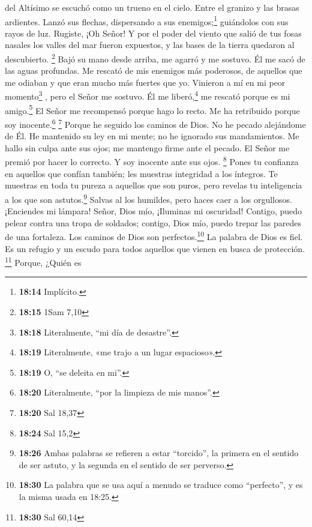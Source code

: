 del Altísimo se escuchó como un trueno en el cielo. Entre el granizo y
las brasas ardientes.  Lanzó sus flechas, dispersando a
sus enemigos;\footnote{\textbf{18:14} Implícito.} guiándolos con sus
rayos de luz.  Rugiste, ¡Oh Señor! Y por el poder del
viento que salió de tus fosas nasales los valles del mar fueron
expuestos, y las bases de la tierra quedaron al descubierto. \footnote{\textbf{18:15}
  1Sam 7,10}  Bajó su mano desde arriba, me agarró y me
sostuvo. Él me sacó de las aguas profundas.  Me rescató
de mis enemigos más poderosos, de aquellos que me odiaban y que eran
mucho más fuertes que yo.  Vinieron a mí en mi peor
momento\footnote{\textbf{18:18} Literalmente, ``mi día de desastre''.} ,
pero el Señor me sostuvo.  Él me liberó,\footnote{\textbf{18:19}
  Literalmente, «me trajo a un lugar espacioso».} me rescató porque es
mi amigo.\footnote{\textbf{18:19} O, ``se deleita en mi''.}
 El Señor me recompensó porque hago lo recto. Me ha
retribuido porque soy inocente.\footnote{\textbf{18:20} Literalmente,
  ``por la limpieza de mis manos''.} \footnote{\textbf{18:20} Sal 18,37}
 Porque he seguido los caminos de Dios. No he pecado
alejándome de Él.  He mantenido su ley en mi mente; no he
ignorado sus mandamientos.  Me hallo sin culpa ante sus
ojos; me mantengo firme ante el pecado.  El Señor me
premió por hacer lo correcto. Y soy inocente ante sus ojos. \footnote{\textbf{18:24}
  Sal 15,2}  Pones tu confianza en aquellos que confían
también; les muestras integridad a los íntegros.  Te
muestras en toda tu pureza a aquellos que son puros, pero revelas tu
inteligencia a los que son astutos.\footnote{\textbf{18:26} Ambas
  palabras se refieren a estar ``torcido'', la primera en el sentido de
  ser astuto, y la segunda en el sentido de ser perverso.}
 Salvas al los humildes, pero haces caer a los
orgullosos.  ¡Enciendes mi lámpara! Señor, Dios mío,
¡Iluminas mi oscuridad!  Contigo, puedo pelear contra una
tropa de soldados; contigo, Dios mío, puedo trepar las paredes de una
fortaleza.  Los caminos de Dios son perfectos.\footnote{\textbf{18:30}
  La palabra que se usa aquí a menudo se traduce como ``perfecto'', y es
  la misma usada en 18:25.} La palabra de Dios es fiel. Es un refugio y
un escudo para todos aquellos que vienen en busca de protección.
\footnote{\textbf{18:30} Sal 60,14}  Porque, ¿Quién es
